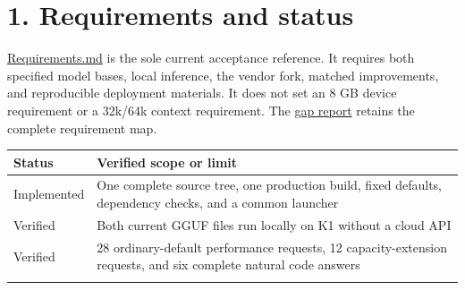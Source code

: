\documentclass[10pt,a4paper]{article}
\begin{document}
\hypertarget{requirements-and-status}{%
\section{1. Requirements and status}\label{requirements-and-status}}

\href{https://github.com/MoyaMryia/riscv-accl/blob/main/Requirements.md}{Requirements.md}
is the sole current acceptance reference. It requires both specified
model bases, local inference, the vendor fork, matched improvements, and
reproducible deployment materials. It does not set an 8 GB device
requirement or a 32k/64k context requirement. The
\href{https://github.com/MoyaMryia/riscv-accl/blob/main/spacemit/reports/2026-10-13-requirements-gap.md}{gap
report} retains the complete requirement map.

\begin{longtable}[]{@{}ll@{}}
\toprule
\begin{minipage}[b]{0.47\columnwidth}\raggedright
Status\strut
\end{minipage} & \begin{minipage}[b]{0.47\columnwidth}\raggedright
Verified scope or limit\strut
\end{minipage}\tabularnewline
\midrule
\endhead
\begin{minipage}[t]{0.47\columnwidth}\raggedright
Implemented\strut
\end{minipage} & \begin{minipage}[t]{0.47\columnwidth}\raggedright
One complete source tree, one production build, fixed defaults,
dependency checks, and a common launcher\strut
\end{minipage}\tabularnewline
\begin{minipage}[t]{0.47\columnwidth}\raggedright
Verified\strut
\end{minipage} & \begin{minipage}[t]{0.47\columnwidth}\raggedright
Both current GGUF files run locally on K1 without a cloud API\strut
\end{minipage}\tabularnewline
\begin{minipage}[t]{0.47\columnwidth}\raggedright
Verified\strut
\end{minipage} & \begin{minipage}[t]{0.47\columnwidth}\raggedright
28 ordinary-default performance requests, 12 capacity-extension
requests, and six complete natural code answers\strut
\end{minipage}\tabularnewline
\begin{minipage}[t]{0.47\columnwidth}\raggedright

\end{minipage}
\end{longtable}
\end{document}
